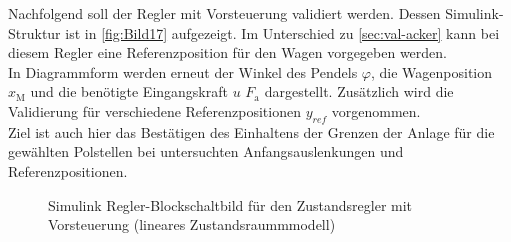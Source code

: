 Nachfolgend soll der Regler mit Vorsteuerung validiert werden. Dessen Simulink-Struktur ist in \autoref{fig:Bild17} aufgezeigt. Im Unterschied zu \autoref{sec:val-acker} kann bei diesem Regler eine Referenzposition für den Wagen vorgegeben werden. \\
In Diagrammform werden erneut der Winkel des Pendels $\varphi$, die Wagenposition $x_{\mathrm{M}}$ und die benötigte Eingangskraft $u$ \bzw $F_{\mathrm{a}}$ dargestellt. Zusätzlich wird die Validierung für verschiedene Referenzpositionen $y_{ref}$ vorgenommen. \\
Ziel ist auch hier das Bestätigen des Einhaltens der Grenzen der Anlage für die gewählten Polstellen bei untersuchten Anfangsauslenkungen und Referenzpositionen. 

\begin{figure}[H]
    \centering
    \caption[Regler mit Vorsteuerung Simulink (linear)]{Simulink Regler-Blockschaltbild für den Zustandsregler mit Vorsteuerung (lineares Zustandsraummmodell)}
    \label{fig:Bild17}
\end{figure}

